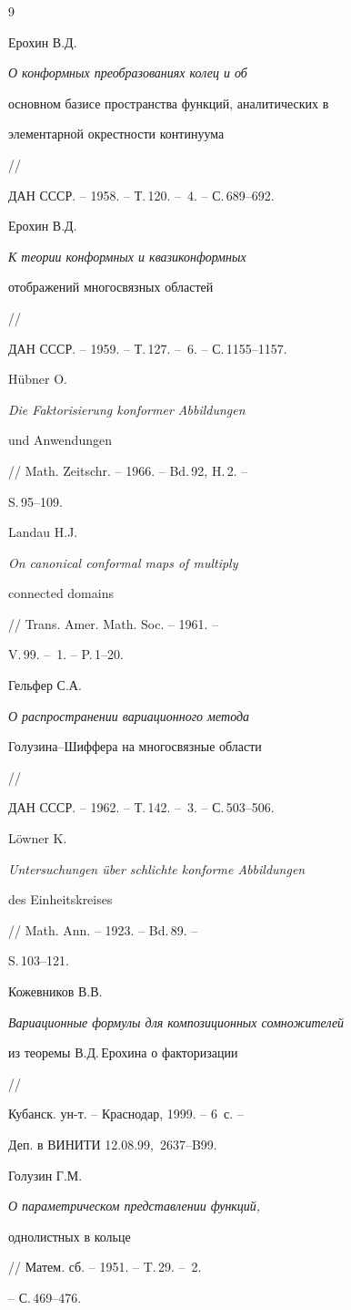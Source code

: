 \begin{thebibliography}{9}







Ерохин В.Д. {\em О конформных преобразованиях колец и об 


основном базисе пространства функций, аналитических в 


элементарной окрестности континуума} //


ДАН СССР. -- 1958. -- Т.\,120. -- \No\,4. -- С.\,689--692.




Ерохин В.Д. {\em К теории конформных и квазиконформных 


отображений многосвязных областей} //


ДАН СССР. -- 1959. -- Т.\,127. -- \No\,6. -- С.\,1155--1157.




H\"ubner O. {\em Die Faktorisierung konformer Abbildungen


und Anwendungen} // Math. Zeitschr. -- 1966. -- Bd.\,92, H.\,2. --


S.\,95--109.




Landau H.J. {\em On canonical conformal maps of multiply


connected domains} // Trans. Amer. Math. Soc. -- 1961. --


V.\,99. -- \No\,1. -- P.\,1--20.




Гельфер С.А. {\em О распространении вариационного метода


Голузина--Шиффера на многосвязные области} //


ДАН СССР. -- 1962. -- Т.\,142. -- \No\,3. -- С.\,503--506.




L\"owner K. {\em Untersuchungen \"uber schlichte konforme Abbildungen


des Einheitskreises} // Math. Ann. -- 1923. -- Bd.\,89. -- 


S.\,103--121.




Кожевников В.В. {\em Вариационные формулы для композиционных сомножителей 


из теоремы В.Д.\,Ерохина о факторизации} //


Кубанск. ун-т. -- Краснодар, 1999. -- 6~с. --


Деп. в ВИНИТИ 12.08.99, \No\,2637--B99.




Голузин Г.М. {\em О параметрическом представлении функций,


однолистных в кольце} // Матем. сб. -- 1951. -- T.\,29. -- \No\,2.


-- С.\,469--476.





\end{thebibliography}





